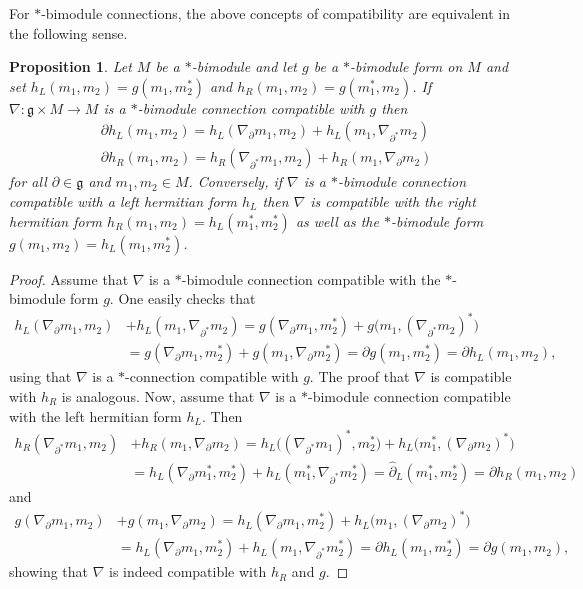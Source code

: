 \documentclass{amsart}
\newcommand{\paraa}[1]{\big(#1\big)}
\newtheorem{proposition}[theorem]{Proposition}
\theoremstyle{definition}
\theoremstyle{remark}
\numberwithin{equation}{section}
\renewcommand{\d}{\partial}
\newcommand{\g}{\mathfrak{g}}
\renewcommand{\dh}{\hat{\partial}}
\begin{document}
\noindent
For $\ast$-bimodule connections, the above concepts of compatibility
are equivalent in the following sense.

\begin{proposition}\label{prop:bimodule.comp.gives.lr.comp}
  Let $M$ be a $\ast$-bimodule and let $g$ be a $\ast$-bimodule
  form on $M$ and set $h_L(m_1,m_2) = g(m_1,m_2^\ast)$ and
  $h_R(m_1,m_2) = g(m_1^\ast,m_2)$.  If $\nabla:\g\times M\to M$ is a
  $\ast$-bimodule connection compatible with $g$ then
  \begin{align*}
    &\d h_L(m_1,m_2) = h_L(\nabla_\d m_1,m_2) + h_L(m_1,\nabla_{\d^\ast}m_2)\\
    &\d h_R(m_1,m_2) = h_R(\nabla_{\d^\ast} m_1,m_2) + h_R(m_1,\nabla_{\d}m_2)
  \end{align*}
  for all $\d\in\g$ and $m_1,m_2\in M$. Conversely, if $\nabla$ is a
  $\ast$-bimodule connection compatible with a left hermitian form
  $h_L$ then $\nabla$ is compatible with the right hermitian form
  $h_R(m_1,m_2)=h_L(m_1^\ast,m_2^\ast)$ as well as the $\ast$-bimodule
  form $g(m_1,m_2)=h_L(m_1,m_2^\ast)$.
\end{proposition}

\begin{proof}
  Assume that $\nabla$ is a $\ast$-bimodule connection compatible with the $\ast$-bimodule form $g$.
  One easily checks that
  \begin{align*}
    h_L(\nabla_\d m_1,m_2)
    &+ h_L(m_1,\nabla_{\d^\ast}m_2)
      = g(\nabla_{\d}m_1,m_2^\ast)+g\paraa{m_1,(\nabla_{\d^\ast}m_2)^\ast}\\
    &= g(\nabla_{\d}m_1,m_2^\ast) + g(m_1,\nabla_{\d}m_2^\ast)
      = \d g(m_1,m_2^\ast) = \d h_L(m_1,m_2),
  \end{align*}
  using that $\nabla$ is a $\ast$-connection compatible with $g$. The
  proof that $\nabla$ is compatible with $h_R$ is analogous. Now,
  assume that $\nabla$ is a $\ast$-bimodule connection compatible with
  the left hermitian form $h_L$. Then
  \begin{align*}
    h_R(\nabla_{\d^\ast}m_1,m_2)
    &+ h_R(m_1,\nabla_{\d}m_2)
      = h_L\paraa{(\nabla_{\d^\ast}m_1)^\ast,m_2^\ast}
      +h_L\paraa{m_1^\ast,(\nabla_{\d}m_2)^\ast}\\
    &= h_L(\nabla_{\d}m_1^\ast,m_2^\ast) + h_L(m_1^\ast,\nabla_{\d^\ast}m_2^\ast)
      = \dh_L(m_1^\ast,m_2^\ast) = \d h_R(m_1,m_2)
  \end{align*}
  and
  \begin{align*}
    g(\nabla_{\d}m_1,m_2)
    &+g(m_1,\nabla_{\d}m_2)
      = h_L(\nabla_{\d}m_1,m_2^\ast) + h_L\paraa{m_1,(\nabla_{\d}m_2)^\ast}\\
    &=h_L(\nabla_{\d}m_1,m_2^\ast) + h_L(m_1,\nabla_{\d^\ast}m_2^\ast)
      =\d h_L(m_1,m_2^\ast) = \d g(m_1,m_2),
  \end{align*}
  showing that $\nabla$ is indeed compatible with $h_R$ and $g$.
\end{proof}
\end{document}
